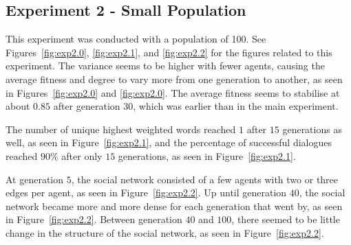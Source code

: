 \clearpage
\subsection{Experiment 2 - Small Population}
This experiment was conducted with a population of 100. See Figures~\ref{fig:exp2.0}, \ref{fig:exp2.1}, and \ref{fig:exp2.2} for the figures related to this experiment. The variance seems to be higher with fewer agents, causing the average fitness and degree to vary more from one generation to another, as seen in Figures~\ref{fig:exp2.0} and \ref{fig:exp2.0}. The average fitness seems to stabilise at about $0.85$ after generation $30$, which was earlier than in the main experiment. 

The number of unique highest weighted words reached $1$ after $15$ generations as well, as seen in Figure~\ref{fig:exp2.1}, and the percentage of successful dialogues reached $90\%$ after only $15$ generations, as seen in Figure~\ref{fig:exp2.1}. 

At generation $5$, the social network consisted of a few agents with two or three edges per agent, as seen in Figure~\ref{fig:exp2.2}. Up until generation $40$, the social network became more and more dense for each generation that went by, as seen in Figure~\ref{fig:exp2.2}. Between generation $40$ and $100$, there seemed to be little change in the structure of the social network, as seen in Figure~\ref{fig:exp2.2}.

